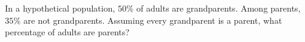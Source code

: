 In a hypothetical population, $50\%$ of adults are grandparents. Among parents, $35\%$ are not grandparents. Assuming every grandparent is a parent, what percentage of adults are parents?
